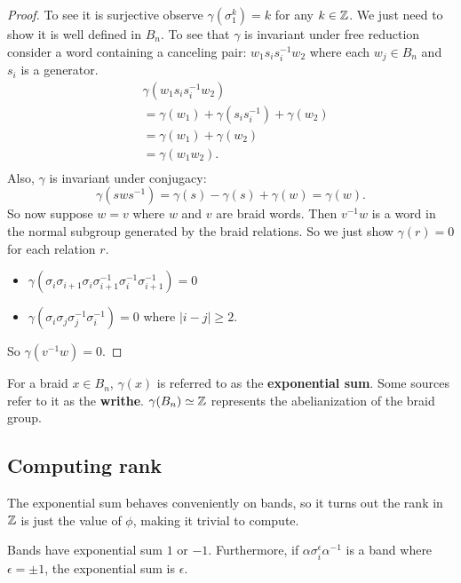 \documentclass[12pt]{thesis}
\begin{document}
\begin{proof}
    To see it is surjective observe $\gamma(\sigma_{1}^{k}) = k$ for any $k \in \mathbb{Z}$.
    We just need to show it is well defined in $B_{n}$.
    To see that $\gamma$ is invariant under free reduction
    consider a word containing a canceling pair: $w_{1}s_{i}s_{i}^{-1}w_{2}$
    where each $w_{j} \in B_{n}$ and $s_{i}$ is a generator.
    \[
    \begin{split}
        &\gamma(w_{1}s_{i}s_{i}^{-1}w_{2}) \\
        &= \gamma(w_{1}) + \gamma(s_{i}s_{i}^{-1}) + \gamma(w_{2}) \\
        &= \gamma(w_{1}) + \gamma(w_{2}) \\
        &= \gamma(w_{1}w_{2}). \\
    \end{split}
    \]
    Also, $\gamma$ is invariant under conjugacy:
    \[
        \gamma(sws^{-1}) = \gamma(s) - \gamma(s) + \gamma(w) = \gamma(w).
    \]
    So now suppose $w = v$ where $w$ and $v$ are braid words. 
    Then $v^{-1}w$ is a word in the normal subgroup generated by the braid relations.
    So we just show $\gamma(r) = 0$ for each relation $r$.
    \begin{itemize}
        \item $\gamma(\sigma_{i}\sigma_{i+1}\sigma_{i}\sigma_{i+1}^{-1}\sigma_{i}^{-1}\sigma_{i+1}^{-1}) = 0$
        \item $\gamma(\sigma_{i}\sigma_{j}\sigma_{j}^{-1}\sigma_{i}^{-1}) = 0$ where $|i - j| \geq 2$.
    \end{itemize}
    So $\gamma(v^{-1}w) = 0$.
\end{proof}

\begin{definition}
    For a braid $x \in B_{n}$,
    $\gamma(x)$ is referred to as the \textbf{exponential sum}.
    Some sources refer to it as the \textbf{writhe}.
    $\gamma(B_{n}) \simeq \mathbb{Z}$ represents the abelianization of the braid group.
\end{definition}

\subsection{Computing rank}

The exponential sum behaves conveniently on bands,
so it turns out the rank in $\mathbb{Z}$ is just the value of $\phi$,
making it trivial to compute.

\begin{proposition}
    \label{prop:exponential-sum-of-band}
Bands have exponential sum $1$ or $-1$.
Furthermore, if $\alpha \sigma_{i}^{\epsilon} \alpha^{-1}$ is a band where $\epsilon = \pm 1$,
the exponential sum is $\epsilon$.
\end{proposition}
\end{document}

